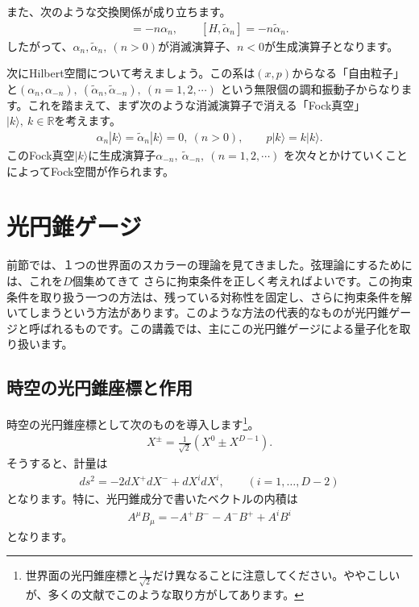 \documentclass[report,paper=a4, fontsize=12pt, line_length=16cm, number_of_lines=33,dvipdfmx]{jlreq}
\numberwithin{equation}{chapter}
\numberwithin{equation}{section}
\newcommand{\Rb}{\mathbb{R}}
\newcommand{\alphat}{\tilde{\alpha}}
\begin{document}
また、次のような交換関係が成り立ちます。
\begin{align}
  [H,\alpha_{n}]=-n\alpha_{n},\qquad [H,\alphat_{n}]=-n\alphat_{n}.
\end{align}
したがって、$\alpha_{n},\alphat_{n},\ (n>0)$が消滅演算子、$n<0$が生成演算子となります。

次にHilbert空間について考えましょう。この系は$(x,p)$からなる「自由粒子」と$(\alpha_n,\alpha_{-n}), \ (\alphat_n,\alphat_{-n}),\ (n=1,2,\cdots)$ という無限個の調和振動子からなります。これを踏まえて、まず次のような消滅演算子で消える「Fock真空」$|k\rangle,\ k\in \Rb$を考えます。
\begin{align}
\alpha_n|k\rangle=\alphat_n|k\rangle=0, \ (n>0),\qquad p|k\rangle=k |k\rangle.
\end{align}
このFock真空$|k\rangle$に生成演算子$\alpha_{-n},\ \alphat_{-n},\ (n=1,2,\cdots)$ を次々とかけていくことによってFock空間が作られます。

\section{光円錐ゲージ}
前節では、１つの世界面のスカラーの理論を見てきました。弦理論にするためには、これを$D$個集めてきて
さらに拘束条件を正しく考えればよいです。この拘束条件を取り扱う一つの方法は、残っている対称性を固定し、さらに拘束条件を解いてしまうという方法があります。このような方法の代表的なものが光円錐ゲージと呼ばれるものです。この講義では、主にこの光円錐ゲージによる量子化を取り扱います。

\subsection{時空の光円錐座標と作用}
時空の光円錐座標として次のものを導入します\footnote{世界面の光円錐座標と$\frac{1}{\sqrt{2}}$だけ異なることに注意してください。ややこしいが、多くの文献でこのような取り方がしてあります。}。
\begin{align}
X^{\pm}=\frac{1}{\sqrt{2}} (X^0\pm X^{D-1}).
\end{align}
そうすると、計量は
\begin{align}
ds^2=-2dX^{+}dX^{-}+dX^{i}dX^{i},\qquad (i=1,\dots,D-2)
\end{align}
となります。特に、光円錐成分で書いたベクトルの内積は
\begin{align}
A^{\mu}B_{\mu}=-A^{+}B^{-}-A^{-}B^{+}+A^{i}B^{i}
\end{align}
となります。
\end{document}
